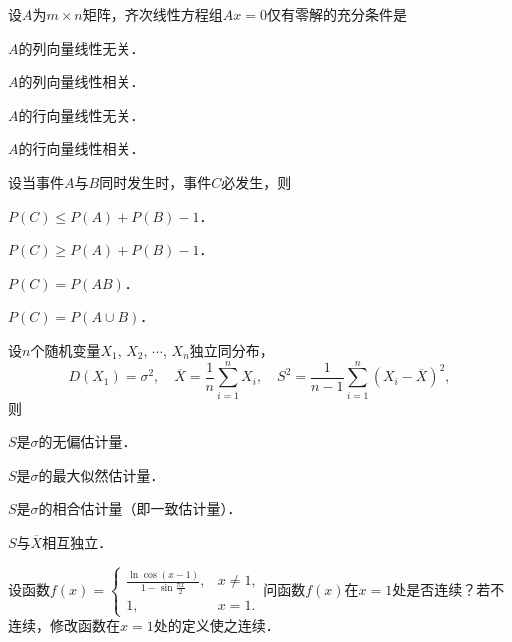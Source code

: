 \documentclass[plain,noanswer,medmath]{../../template/jnuexam}
\begin{document}
\begin{problem}
设$A$为$m \times n$矩阵，齐次线性方程组$Ax = 0$仅有零解的充分条件是\pickout{}
\begin{abcd}
\item $A$的列向量线性无关．               
\item $A$的列向量线性相关．
\item $A$的行向量线性无关．               
\item $A$的行向量线性相关．
\end{abcd}
\end{problem}


\begin{problem}
设当事件$A$与$B$同时发生时，事件$C$必发生，则\pickout{}
\begin{abcd}
\item $P(C) \le P(A) + P(B) - 1$．
\item $P(C) \ge P(A) + P(B)- 1$．
\item $P(C)= P(AB)$．
\item $P(C) = P(A \cup B)$．
\end{abcd}
\end{problem}


\begin{problem}
设$n$个随机变量$X_1$, $X_2$, $\cdots$, $X_n$独立同分布，
$$D(X_1) = \sigma^2,\quad \overline{X}= \frac{1}{n}\sum_{i = 1}^n X_i,\quad
  S^2 = \frac{1}{n - 1}\sum_{i = 1}^n (X_i - \overline{X})^2,$$
则\pickout{}
\begin{abcd}
\item $S$是$\sigma$的无偏估计量．					
\item $S$是$\sigma$的最大似然估计量．
\item $S$是$\sigma$的相合估计量（即一致估计量）．	
\item $S$与$\overline{X}$相互独立．
\end{abcd}
\end{problem}



\begin{problem}
设函数$f(x) = \begin{cases}
  \frac{\ln\cos(x-1)}{1-\sin\frac{\pi x}{2}}, & x \ne 1, \\
                                           1, & x = 1.
\end{cases}$问函数$f(x)$在$x = 1$处是否连续？若不连续，修改函数在$x = 1$处的定义使之连续．
\end{problem}


\end{document}
